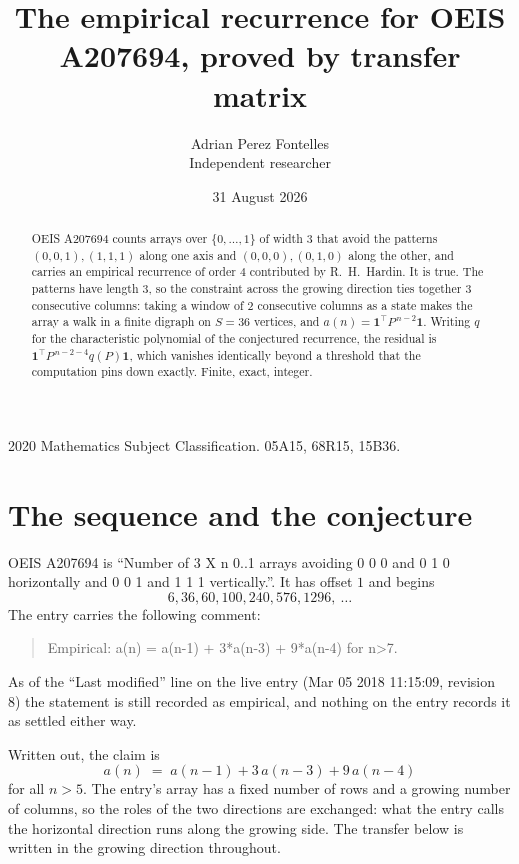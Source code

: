 \documentclass[11pt,a4paper]{article}
\title{The empirical recurrence for OEIS A207694, proved by transfer matrix}
\author{Adrian Perez Fontelles\\ \small Independent researcher}
\date{31 August 2026}
\theoremstyle{plain}
\theoremstyle{definition}
\begin{document}
\maketitle

\begin{abstract}
OEIS A207694 counts arrays over $\{0,\dots,1\}$ of width $3$ that avoid the patterns
$(0,0,1), (1,1,1)$ along one axis and $(0,0,0), (0,1,0)$ along the other, and carries an empirical recurrence of
order $4$ contributed by R.~H.~Hardin. It is true. The patterns have length $3$, so
the constraint across the growing direction ties together $3$ consecutive columns: taking a
window of $2$ consecutive columns as a state makes the array a walk in a finite digraph
on $S=36$ vertices, and $a(n)=\mathbf{1}^{\!\top}P^{\,n-2}\mathbf{1}$. Writing $q$
for the characteristic polynomial of the conjectured recurrence, the residual is
$\mathbf{1}^{\!\top}P^{\,n-2-4}q(P)\mathbf{1}$, which vanishes identically
beyond a threshold that the computation pins down exactly. Finite, exact, integer.
\end{abstract}

\noindent\small 2020 Mathematics Subject Classification. 05A15, 68R15, 15B36.\normalsize

\section{The sequence and the conjecture}

OEIS A207694 is ``Number of 3 X n 0..1 arrays avoiding 0 0 0 and 0 1 0 horizontally and 0 0 1 and 1 1 1 vertically.''. It has offset
$1$ and begins
\[
6, 36, 60, 100, 240, 576, 1296,\ \dots
\]
The entry carries the following comment:
\begin{quote}\small
Empirical: a(n) = a(n-1) + 3*a(n-3) + 9*a(n-4) for n>7.
\end{quote}
As of the ``Last modified'' line on the live entry (Mar 05 2018 11:15:09, revision
8) the statement is still recorded as empirical, and nothing on the entry
records it as settled either way.

Written out, the claim is
\begin{equation}\label{eq:conj}
a(n)\;=\;a(n-1) + 3\,a(n-3) + 9\,a(n-4)
\end{equation}
for all $n>5$. The entry's array has a fixed number of rows and a growing number of
columns, so the roles of the two directions are exchanged: what the entry calls the
horizontal direction runs along the growing side. The transfer below is written in the
growing direction throughout.
\end{document}
